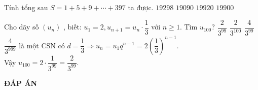 \begin{ex} %
	Tính tổng sau $S=1+5+9+\cdots+397$ ta được.
	\choice
	{$19298$}
	{$19090$}
	{$19920$}
	{\True $19900$}
\end{ex}
\begin{ex} %
	Cho dãy số  $\left({u}_{n}\right)$ , biết:  ${u}_{1}=2,  {u}_{n+1}={u}_{n}\cdot\dfrac{1}{3}$  với  $n\geqslant 1$. Tìm  ${u}_{100}$?
	\choice
	{\True $\dfrac{2}{3^{99}}$} 	
	{$\dfrac{2}{3^{100}}$}
	{$\dfrac{4}{3^{99}}$}
	{$\dfrac{4}{3^{999}}$}
 là một CSN có $d=\dfrac{1}{3} \Rightarrow u_n=u_1q^{n-1}=2\left(\dfrac{1}{3}\right)^{n-1}$.\\
	Vậy $u_{100}=2 \cdot \dfrac{1}{3^{99}}=\dfrac{2}{3^{99}}$.
\end{ex}


\newpage
\begin{center}
	\textbf{ĐÁP ÁN}
\end{center}
\begin{multicols}{10}
	 
\end{multicols}